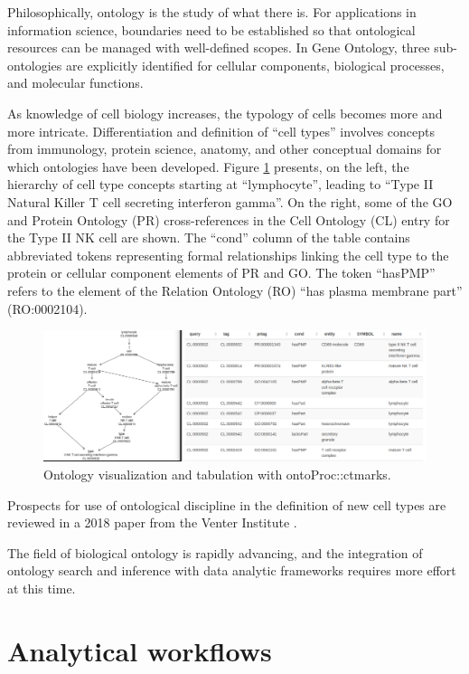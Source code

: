 \documentclass[graybox]{svmult}
\begin{document}
Philosophically, ontology is the study of what there is. For
applications in information
science,
boundaries need to be established so that ontological
resources can be managed with well-defined scopes. In Gene
Ontology, three sub-ontologies are explicitly identified for
cellular components, biological processes, and molecular functions.

As knowledge of cell biology increases, the typology of
cells becomes more and more intricate. Differentiation
and definition
of ``cell types'' involves concepts from immunology,
protein science, anatomy, and other conceptual domains
for which ontologies have been developed. Figure \ref{fig:ontopair}
presents, on the left, the hierarchy of cell type concepts starting at ``lymphocyte'',
leading to ``Type II Natural Killer T cell secreting interferon gamma''.
On the right, some of the GO and Protein Ontology (PR) cross-references
in the Cell Ontology (CL) entry for the Type II NK cell are shown.
The ``cond'' column of the table contains abbreviated tokens
representing formal relationships linking the cell type
to the protein or cellular component elements of PR and GO.
The token ``hasPMP'' refers to the element of the Relation Ontology
(RO) ``has plasma membrane part'' (RO:0002104).

\begin{figure}
\includegraphics[width=1\linewidth,]{ontoPair} \caption{Ontology visualization and tabulation with ontoProc::ctmarks.}\label{fig:ontopair}
\end{figure}

Prospects for use of ontological discipline in the
definition of new cell types are reviewed in a 2018
paper from the Venter Institute \cite{Aevermann2018}.

The field of biological ontology is rapidly advancing,
and the integration of ontology search and inference
with data analytic frameworks requires more effort at this time.



\section{Analytical workflows}\label{analytical-workflows}
\end{document}
